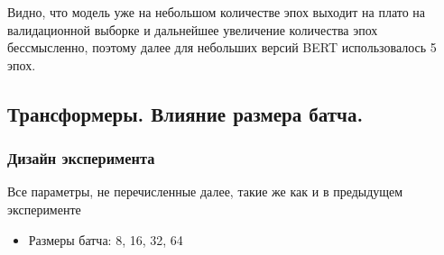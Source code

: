 \documentclass{article}
\begin{document}
\begin{figure}[h]
    \caption{}
	\label{eq:exp5_fig1}
\end{figure}


Видно, что модель уже на небольшом количестве эпох выходит на плато на валидационной выборке и дальнейшее увеличение количества эпох бессмысленно, поэтому далее для небольших версий  BERT использовалось 5 эпох.

\subsection{Трансформеры. Влияние размера батча.}
\subsubsection{Дизайн эксперимента}
Все параметры, не перечисленные далее, такие же как и в предыдущем эксперименте
\begin{itemize}
    \item Размеры батча: 8, 16, 32, 64
\end{itemize}
\end{document}
